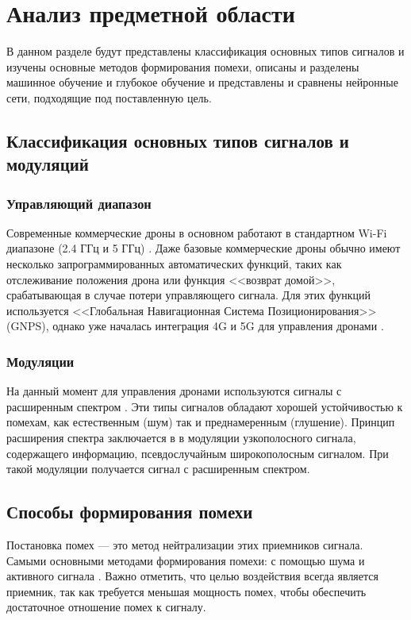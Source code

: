\chapter{Анализ предметной области}

В данном разделе будут представлены классификация основных типов сигналов и изучены основные методов формирования помехи, описаны и разделены машинное обучение и глубокое обучение и представлены и сравнены нейронные сети, подходящие под поставленную цель.

\section{Классификация основных типов сигналов и модуляций}

\subsection*{Управляющий диапазон}
Современные коммерческие дроны в основном работают в стандартном Wi-Fi диапазоне (2.4 ГГц и 5 ГГц) \cite{wifidiapazon}. Даже базовые коммерческие дроны обычно имеют несколько запрограммированных автоматических функций, таких как отслеживание положения дрона или функция <<возврат домой>>, срабатывающая в случае потери управляющего сигнала. Для этих функций используется <<Глобальная Навигационная Система Позиционирования>> (GNPS), однако уже началась интеграция 4G и 5G для управления дронами \cite{4gand5g}.

\subsection*{Модуляции}

На данный момент для управления дронами используются сигналы с расширенным спектром \cite{spreadspecsignals}. Эти типы сигналов обладают хорошей устойчивостью к помехам, как естественным (шум) так и преднамеренным (глушение). Принцип расширения спектра заключается в в модуляции \cite{signalmodulation} узкополосного сигнала, содержащего информацию, псевдослучайным широкополосным сигналом. При такой модуляции получается сигнал с расширенным спектром.

\section{Способы формирования помехи}

Постановка помех --- это метод нейтрализации этих приемников сигнала. Самыми основными методами формирования помехи: с помощью шума и активного сигнала \cite{radioelecpomeh}. Важно отметить, что целью воздействия всегда является приемник, так как требуется меньшая мощность помех, чтобы обеспечить достаточное отношение помех к сигналу.

